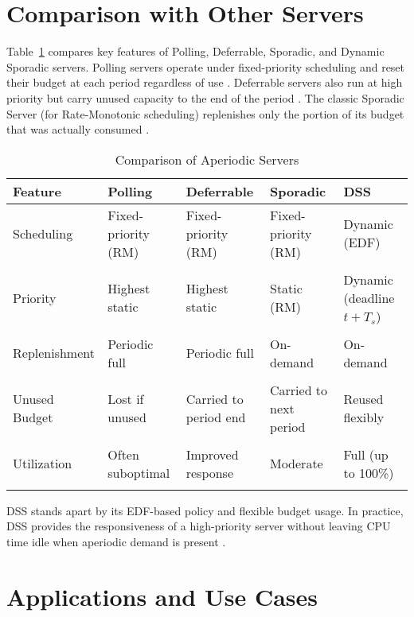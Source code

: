 \documentclass[conference]{IEEEtran}
\begin{document}
\section{Comparison with Other Servers}
Table~\ref{tab:servers} compares key features of Polling, Deferrable, Sporadic, and Dynamic Sporadic servers.  Polling servers operate under fixed-priority scheduling and reset their budget at each period regardless of use \cite{sprunt1989aperiodic}.  Deferrable servers also run at high priority but carry unused capacity to the end of the period \cite{buttazzo2011hard}.  The classic Sporadic Server (for Rate-Monotonic scheduling) replenishes only the portion of its budget that was actually consumed \cite{sprunt1989aperiodic}.  


\begin{table}[ht]
\centering
\renewcommand{\arraystretch}{1.1} %
\begin{tabularx}{\columnwidth}{l|X|X|X|X}
\textbf{Feature} & \textbf{Polling} & \textbf{Deferrable} & \textbf{Sporadic} & \textbf{DSS} \\
\hline
Scheduling & Fixed-priority (RM) & Fixed-priority (RM) & Fixed-priority (RM) & Dynamic (EDF) \\\\
Priority & Highest static & Highest static & Static (RM) & Dynamic (deadline $t+T_s$) \\\\
Replenishment & Periodic full & Periodic full & On-demand & On-demand \\\\
Unused Budget & Lost if unused & Carried to period end & Carried to next period & Reused flexibly \\\\
Utilization & Often suboptimal & Improved response & Moderate & Full (up to 100\%) \\\\
\end{tabularx}
\caption{Comparison of Aperiodic Servers}
\label{tab:servers}
\end{table}


DSS stands apart by its EDF-based policy and flexible budget usage.  In practice, DSS provides the responsiveness of a high-priority server without leaving CPU time idle when aperiodic demand is present \cite{buttazzo2011hard, laplante2011real}.

\section{Applications and Use Cases}
\end{document}
